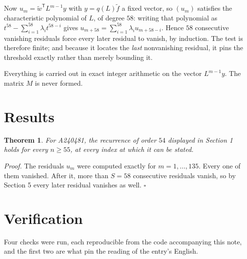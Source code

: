 \documentclass[11pt]{article}
\newtheorem{theorem}{Theorem}
\theoremstyle{definition}
\begin{document}
Now $u_m = \tilde w^{\mathsf T} L^{m-1} y$ with $y = q(L)\tilde f$ a fixed vector, so $(u_m)$ satisfies the characteristic polynomial of $L$, of degree $58$: writing that polynomial as $t^{58} - \sum_{i=1}^{58} \lambda_i t^{58-i}$ gives $u_{m+58} = \sum_{i=1}^{58} \lambda_i u_{m+58-i}$. Hence $58$ consecutive vanishing residuals force every later residual to vanish, by induction. The test is therefore finite; and because it locates the {\itshape last} nonvanishing residual, it pins the threshold exactly rather than merely bounding it.

Everything is carried out in exact integer arithmetic on the vector $L^{m-1}y$. The matrix $M$ is never formed.

\section{Results}

\begin{theorem} For A240481, the recurrence of order $54$ displayed in Section 1 holds for every $n \ge 55$, at every index at which it can be stated.\end{theorem}

{\itshape Proof.} The residuals $u_m$ were computed exactly for $m = 1,\dots,135$. Every one of them vanished. After it, more than $S = 58$ consecutive residuals vanish, so by Section 5 every later residual vanishes as well. $\square$

\section{Verification}

Four checks were run, each reproducible from the code accompanying this note, and the first two are what pin the reading of the entry's English.
\end{document}

